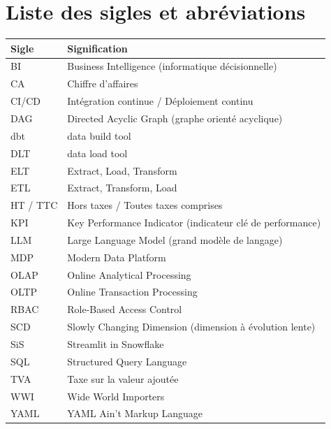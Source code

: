 \chapter*{Liste des sigles et abréviations}

\begin{longtable}{@{}p{3cm}p{11.5cm}@{}}
\toprule
\textbf{Sigle} & \textbf{Signification} \\
\midrule
\endhead
BI & Business Intelligence (informatique décisionnelle) \\
CA & Chiffre d'affaires \\
CI/CD & Intégration continue / Déploiement continu \\
DAG & Directed Acyclic Graph (graphe orienté acyclique) \\
dbt & data build tool \\
DLT & data load tool \\
ELT & Extract, Load, Transform \\
ETL & Extract, Transform, Load \\
HT / TTC & Hors taxes / Toutes taxes comprises \\
KPI & Key Performance Indicator (indicateur clé de performance) \\
LLM & Large Language Model (grand modèle de langage) \\
MDP & Modern Data Platform \\
OLAP & Online Analytical Processing \\
OLTP & Online Transaction Processing \\
RBAC & Role-Based Access Control \\
SCD & Slowly Changing Dimension (dimension à évolution lente) \\
SiS & Streamlit in Snowflake \\
SQL & Structured Query Language \\
TVA & Taxe sur la valeur ajoutée \\
WWI & Wide World Importers \\
YAML & YAML Ain't Markup Language \\
\bottomrule
\end{longtable}
